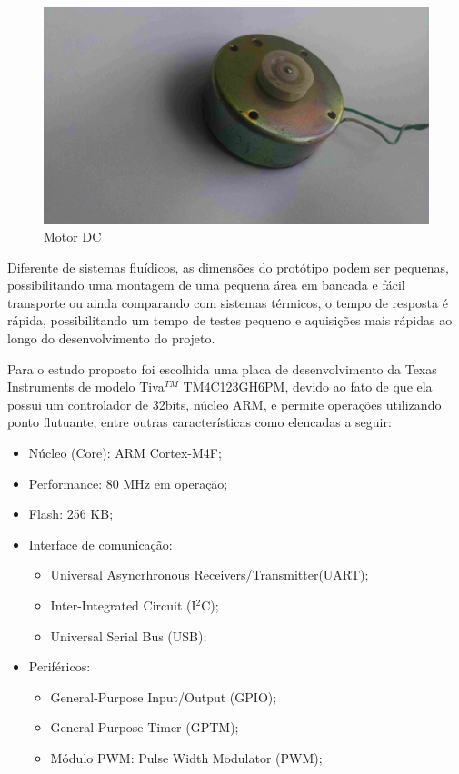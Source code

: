 \begin{figure}[!htb]
\center\includegraphics[scale=0.1, angle=0, clip=true, trim=1500 500 400 200]
{./imagens/motorDC.jpg}
\caption{Motor DC}
\label{fig:motor DC}
\end{figure}

Diferente de sistemas fluídicos, as dimensões do protótipo podem ser pequenas, possibilitando uma montagem de uma pequena área em bancada e fácil transporte ou ainda comparando com sistemas térmicos, o tempo de resposta é rápida, possibilitando um tempo de testes pequeno e aquisições mais rápidas ao longo do desenvolvimento do projeto.






Para o estudo proposto foi escolhida uma placa de desenvolvimento da Texas Instruments de modelo Tiva$^{TM}$ TM4C123GH6PM, devido ao fato de que ela possui um controlador de 32bits, núcleo ARM, e permite operações utilizando ponto flutuante, entre outras características como elencadas a seguir:

\begin{itemize}
\item Núcleo (Core): ARM Cortex-M4F;
\item Performance: 80 MHz em operação;
\item Flash: 256 KB;
\item Interface de comunicação:
	\begin{itemize}
	\item  Universal Asyncrhronous Receivers/Transmitter(UART);
  	\item Inter-Integrated Circuit (I$^2$C);
	\item Universal Serial Bus (USB);
	\end{itemize}
\item Periféricos:
	\begin{itemize}
	\item General-Purpose Input/Output (GPIO);
	\item General-Purpose Timer (GPTM);
	\item Módulo PWM: Pulse Width Modulator (PWM);
	\end{itemize}
\end{itemize}

